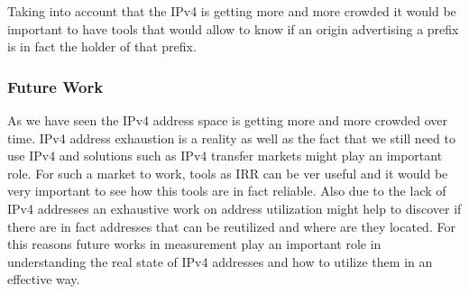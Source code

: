 \documentclass[11pt,a4paper]{scrreprt}
\begin{document}
Taking into account that the IPv4 is getting more and more crowded it would be important to have tools that would allow to know if an origin advertising a prefix is in fact the holder of that prefix.  

\subsubsection{Future Work}

As we have seen the IPv4 address space is getting more and more crowded over time. IPv4 address exhaustion is a reality as well as the fact that we still need to use IPv4 and solutions such as IPv4 transfer markets might play an important role. For such a market to work, tools as IRR can be ver useful and it would be very important to see how this tools are in fact reliable. Also due to the lack of IPv4 addresses an exhaustive work on address utilization might help to discover if there are in fact addresses that can be reutilized and where are they located.
For this reasons future works in measurement play an important role in understanding the real state of IPv4 addresses and how to utilize them in an effective way.
\end{document}
